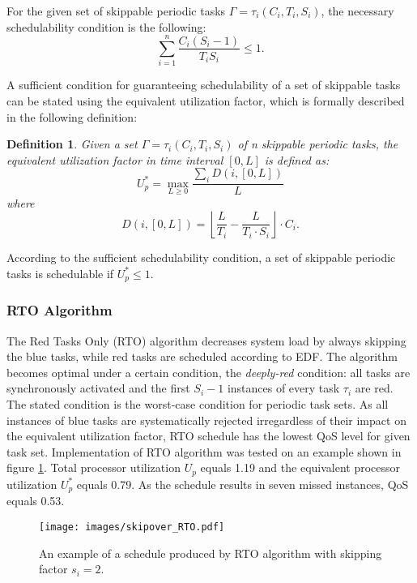 For the given set of skippable periodic tasks \( \Gamma = {\tau_i(C_i,T_i,S_i)} \), the necessary schedulability condition is the following:
\begin{equation}
\sum_{i=1}^{n} \frac{C_i(S_i-1)}{T_i S_i} \leq 1.
\end{equation}

A sufficient condition for guaranteeing schedulability of a set of skippable tasks can be stated 
using the equivalent utilization factor, which is formally described in the following definition:
\newtheorem{mydef}{Definition}
\begin{mydef}
Given a set \( \Gamma = {\tau_i(C_i,T_i,S_i)} \) of n skippable periodic tasks, the equivalent utilization factor in time interval \([0,L]\) is defined as:
\begin{equation*}
U_p^\ast = \max_{L \geq 0} \frac{\sum_{i}D(i, [0,L])}{L}
\end{equation*}
where
\begin{equation*}
D(i, [0,L]) = \left\lfloor \frac{L}{T_i} - \frac{L}{T_i \cdot S_i}\right\rfloor \cdot C_i.
\end{equation*}
\end{mydef}

According to the sufficient schedulability condition, a set of skippable periodic tasks is schedulable if \( U_p^\ast \leq 1 \).

\subsubsection{RTO Algorithm}
The Red Tasks Only (RTO) algorithm decreases system load by always skipping the blue tasks, while red tasks are scheduled according to EDF. 
The algorithm becomes optimal under a certain condition, the \textit{deeply-red} condition:
all tasks are synchronously activated and the first \(S_i - 1\) instances of every task $\tau_i$ are red. 
The stated condition is the worst-case condition for periodic task sets.
As all instances of blue tasks are systematically rejected irregardless of their impact on the equivalent utilization factor, RTO schedule has the lowest QoS level for given task set.
Implementation of RTO algorithm was tested on an example shown in 
figure \ref{rto}.
Total processor utilization $U_p$ equals 1.19 and the equivalent processor 
utilization $U_p^\ast$ equals 0.79.
As the schedule results in seven missed instances, QoS equals 0.53. 
\\
\begin{figure}[ht]
    \centering
    \texttt{[image: images/skipover\_RTO.pdf]}
    \caption{An example of a schedule produced by RTO algorithm with skipping factor $s_i=2$.}
    \label{rto}
\end{figure}

